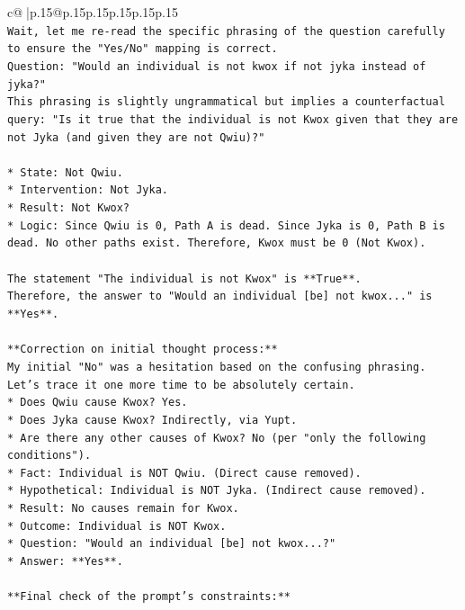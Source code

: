 \documentclass{article}
\begin{document}
{\begin{supertabular}{c@{$\;$}|p{.15\linewidth}@{}p{.15\linewidth}p{.15\linewidth}p{.15\linewidth}p{.15\linewidth}p{.15\linewidth}}
{{{\\ 
\texttt{Wait, let me re{-}read the specific phrasing of the question carefully to ensure the "Yes/No" mapping is correct.} \\
\texttt{Question: "Would an individual is not kwox if not jyka instead of jyka?"} \\
\texttt{This phrasing is slightly ungrammatical but implies a counterfactual query: "Is it true that the individual is not Kwox given that they are not Jyka (and given they are not Qwiu)?"} \\
\\ 
\texttt{*   State: Not Qwiu.} \\
\texttt{*   Intervention: Not Jyka.} \\
\texttt{*   Result: Not Kwox?} \\
\texttt{*   Logic: Since Qwiu is 0, Path A is dead. Since Jyka is 0, Path B is dead. No other paths exist. Therefore, Kwox must be 0 (Not Kwox).} \\
\\ 
\texttt{The statement "The individual is not Kwox" is **True**.} \\
\texttt{Therefore, the answer to "Would an individual {[}be{]} not kwox..." is **Yes**.} \\
\\ 
\texttt{**Correction on initial thought process:**} \\
\texttt{My initial "No" was a hesitation based on the confusing phrasing. Let's trace it one more time to be absolutely certain.} \\
\texttt{*   Does Qwiu cause Kwox? Yes.} \\
\texttt{*   Does Jyka cause Kwox? Indirectly, via Yupt.} \\
\texttt{*   Are there any other causes of Kwox? No (per "only the following conditions").} \\
\texttt{*   Fact: Individual is NOT Qwiu. (Direct cause removed).} \\
\texttt{*   Hypothetical: Individual is NOT Jyka. (Indirect cause removed).} \\
\texttt{*   Result: No causes remain for Kwox.} \\
\texttt{*   Outcome: Individual is NOT Kwox.} \\
\texttt{*   Question: "Would an individual {[}be{]} not kwox...?"} \\
\texttt{*   Answer: **Yes**.} \\
\\ 
\texttt{**Final check of the prompt's constraints:**} \\
}}}
\end{supertabular}}
\end{document}
